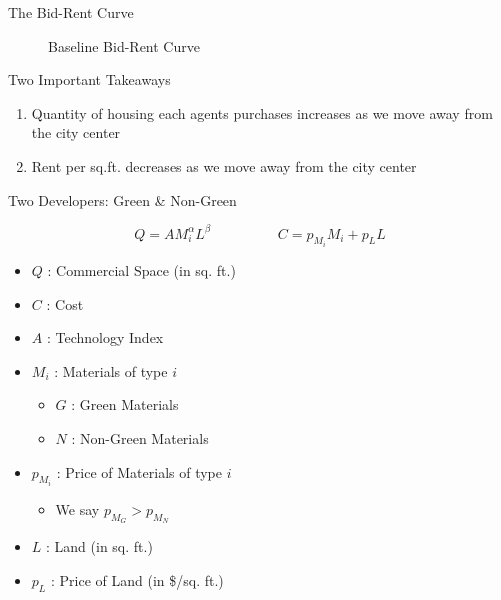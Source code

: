 \documentclass[11pt]{beamer}
\begin{document}
\begin{frame}{The Bid-Rent Curve}

\begin{figure}
\centering
\caption{Baseline Bid-Rent Curve}
\end{figure}

\end{frame}


\begin{frame}{Two Important Takeaways}

\begin{enumerate}
	\item Quantity of housing each agents purchases increases as we move away from the city center
	\vfill
	
	\item Rent per sq.ft. decreases as we move away from the city center
\end{enumerate}

\end{frame}




\begin{frame}{Two Developers: Green \& Non-Green}

$$Q = A M_i^\alpha L^\beta \hspace{2cm} C = p_{M_i} M_i + p_L L$$

\vfill
\footnotesize
\begin{itemize}
	\item $Q$ : Commercial Space (in sq. ft.)
	\item $C$ : Cost 
	\item $A$ : Technology Index
	\item $M_i$ : Materials of type $i$
	\begin{itemize}
		\item $G$ : Green Materials
		\item $N$ : Non-Green Materials
	\end{itemize}
	\item $p_{M_i}$ : Price of Materials of type $i$
	\begin{itemize}
		\item We say $p_{M_G} > p_{M_N}$
	\end{itemize}
	\item $L$ : Land (in sq. ft.)
	\item $p_L$ : Price of Land (in \$/sq. ft.)
\end{itemize}

\end{frame}
\end{document}
